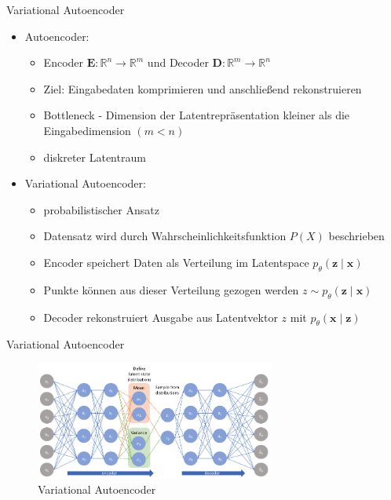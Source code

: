 

\begin{frame}{Variational Autoencoder}
  \begin{itemize}
      
      \item Autoencoder: \begin{itemize}
        \item Encoder $\mathbf{E}:\mathbb{R}^n \rightarrow \mathbb{R}^m$ und Decoder $\mathbf{D}:\mathbb{R}^m \rightarrow \mathbb{R}^n$
        \item Ziel: Eingabedaten komprimieren und anschließend rekonstruieren
        \item Bottleneck - Dimension der Latentrepräsentation kleiner als die Eingabedimension $(m<n)$
        \item diskreter Latentraum
      \end{itemize}
      \item Variational Autoencoder: \begin{itemize}
        \item probabilistischer Ansatz
        \item Datensatz wird durch Wahrscheinlichkeitsfunktion $P(X)$ beschrieben
        \item Encoder speichert Daten als Verteilung im Latentspace $p_\theta (\mathbf{z\mid x})$
        \item Punkte können aus dieser Verteilung gezogen werden $z \sim p_\theta (\mathbf{z\mid x})$
        \item Decoder rekonstruiert Ausgabe aus Latentvektor $z$ mit $p_\theta (\mathbf{x\mid z})$
      \end{itemize}
  \end{itemize}
\end{frame}

\begin{frame}{Variational Autoencoder}
  \begin{figure}
    \includegraphics[width=0.7\textwidth]{bilder/vae.png}
    \caption{Variational Autoencoder}
    \end{figure}
\end{frame}

